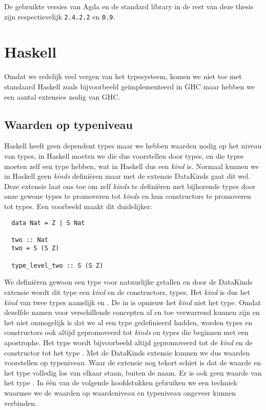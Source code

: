 De gebruikte versies van Agda en de standard library in de rest van deze thesis
zijn respectievelijk \texttt{2.4.2.2} en \texttt{0.9}.


\section{Haskell}

Omdat we redelijk veel vergen van het typesysteem, komen we niet toe met
standaard Haskell zoals bijvoorbeeld geïmplementeerd in GHC maar hebben we een
aantal extensies nodig van GHC.

\subsection{Waarden op typeniveau}

Haskell heeft geen dependent types maar we hebben waarden nodig op het niveau
van types, in Haskell moeten we die dus voorstellen door types, en die types
moeten zelf een type hebben, wat in Haskell dus een \emph{kind} is. Normaal
kunnen we in Haskell geen \emph{kinds} definiëren maar met de extensie
DataKinds \cite{datakinds} gaat dit wel.  Deze extensie laat ons toe om zelf
\emph{kinds} te definiëren met bijhorende types door onze gewone types te
promoveren tot \emph{kinds} en hun constructors te promoveren tot types. Een
voorbeeld maakt dit duidelijker:

\begin{verbatim}
  data Nat = Z | S Nat

  two :: Nat
  two = S (S Z)

  type_level_two :: S (S Z)
\end{verbatim}

We definiëren gewoon een type voor natuurlijke getallen en door de DataKinds
extensie wordt dit type een \emph{kind} en de constructors, types. Het
\emph{kind}  is dus het \emph{kind} van twee types namelijk
 en . De  in  is opnieuw het
\emph{kind}  niet het type. Omdat dezelfde namen voor verschillende
concepten af en toe verwarrend kunnen zijn en het niet onmogelijk is dat we al
een type  gedefinieerd hadden, worden types en constructors ook altijd
gepromoveerd tot \emph{kinds} en types die beginnen met een apostrophe. Het
type  wordt bijvoorbeeld altijd gepromoveerd tot de \emph{kind}
 en de constructor  tot het type .  Met de
DataKinds extensie kunnen we dus waarden voorstellen op typeniveau. Waar de
extensie nog tekort schiet is dat de waarde  en het type 
volledig los van elkaar staan, buiten de naam. Er is ook geen waarde van het
type . In één van de volgende hoofdstukken gebruiken we een techniek
waarmee we de waarden op waardeniveau en typeniveau ongeveer kunnen verbinden.

